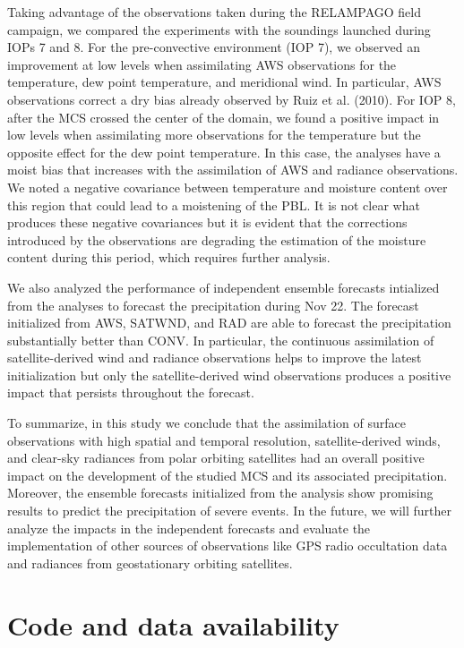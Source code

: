 \documentclass[final,5p,times,twocolumn,authoryear]{elsarticle} %
\begin{document}
Taking advantage of the observations taken during the RELAMPAGO field campaign, we compared the experiments with the soundings launched during IOPs 7 and 8. For the pre-convective environment (IOP 7), we observed an improvement at low levels when assimilating AWS observations for the temperature, dew point temperature, and meridional wind. In particular, AWS observations correct a dry bias already observed by Ruiz et al. (2010). For IOP 8, after the MCS crossed the center of the domain, we found a positive impact in low levels when assimilating more observations for the temperature but the opposite effect for the dew point temperature. In this case, the analyses have a moist bias that increases with the assimilation of AWS and radiance observations. We noted a negative covariance between temperature and moisture content over this region that could lead to a moistening of the PBL. It is not clear what produces these negative covariances but it is evident that the corrections introduced by the observations are degrading the estimation of the moisture content during this period, which requires further analysis.

We also analyzed the performance of independent ensemble forecasts intialized from the analyses to forecast the precipitation during Nov 22. The forecast initialized from AWS, SATWND, and RAD are able to forecast the precipitation substantially better than CONV. In particular, the continuous assimilation of satellite-derived wind and radiance observations helps to improve the latest initialization but only the satellite-derived wind observations produces a positive impact that persists throughout the forecast.

To summarize, in this study we conclude that the assimilation of surface observations with high spatial and temporal resolution, satellite-derived winds, and clear-sky radiances from polar orbiting satellites had an overall positive impact on the development of the studied MCS and its associated precipitation. Moreover, the ensemble forecasts initialized from the analysis show promising results to predict the precipitation of severe events. In the future, we will further analyze the impacts in the independent forecasts and evaluate the implementation of other sources of observations like GPS radio occultation data and radiances from geostationary orbiting satellites.

\hypertarget{code-and-data-availability}{%
\section{Code and data availability}\label{code-and-data-availability}}
\end{document}
